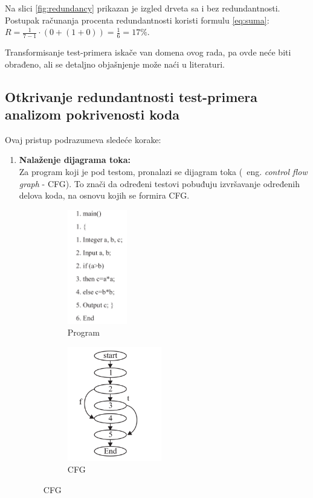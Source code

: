 \documentclass[a4paper]{article}
\begin{document}
Na slici \ref{fig:redundancy} prikazan je izgled drveta sa i bez redundantnosti. Postupak računanja procenta redundantnosti koristi formulu \ref{eq:suma}:
$ R = \frac{1}{7-1} \cdot (0 + (1+0)) = \frac{1}{6} = 17\% $.

Transformisanje test-primera iskače van domena ovog rada, pa ovde neće biti obrađeno, ali se detaljno objašnjenje može naći u literaturi\cite{prvinacin}.

\subsection{Otkrivanje redundantnosti test-primera analizom pokrivenosti koda}
\label{subsec:drugi}

Ovaj pristup\cite{druginacin} podrazumeva sledeće korake:
\begin{enumerate}
    \item \textbf{Nalaženje dijagrama toka:}\\
    Za program koji je pod testom, pronalazi se dijagram toka (~eng. \textit{control flow graph} - CFG). To znači da određeni testovi pobuđuju izvršavanje određenih delova koda, na osnovu kojih se formira CFG.
        \begin{figure}[h!]

        \begin{subfigure}{0.5\textwidth}
        \centerline{\includegraphics[width=0.5\linewidth, height=5cm]{program.png}}
        \caption{Program}
        \label{fig:program}
        \end{subfigure}
        \begin{subfigure}{0.5\textwidth}
        \centerline{\includegraphics[width=0.9\linewidth, height=5cm]{CFG.png}}
        \caption{CFG}
        \label{fig:CFG}
        \end{subfigure}


\end{figure}
\end{enumerate}
\end{document}
